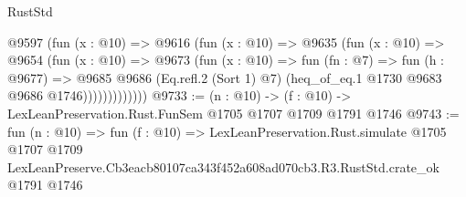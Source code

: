 \begin{lexlean}{RustStd}
\begin{coremodule}
                @9597
                  (fun (x : @10) =>
                  @9616
                    (fun (x : @10) =>
                    @9635
                      (fun (x : @10) =>
                      @9654
                        (fun (x : @10) =>
                        @9673
                          (fun (x : @10) =>
                          fun (fn : @7) =>
                          fun (h : @9677) =>
                          @9685
                            @9686
                            (Eq.refl.{2} (Sort 1) @7)
                            (heq_of_eq.{1} @1730 @9683 @9686 @1746)))))))))))))
@9733 := (n : @10) -> (f : @10) -> LexLeanPreservation.Rust.FunSem @1705 @1707 @1709 @1791 @1746
@9743 := fun (n : @10) =>
  fun (f : @10) =>
  LexLeanPreservation.Rust.simulate
    @1705
    @1707
    @1709
    LexLeanPreserve.Cb3eacb80107ca343f452a608ad070cb3.R3.RustStd.crate_ok
    @1791
    @1746
\end{coremodule}
\end{lexlean}
